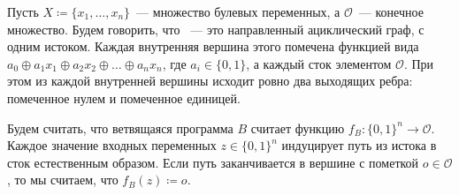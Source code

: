 \begin{definition*}
    Пусть $X \coloneqq \{x_1, \dots, x_n\}$~--- множество булевых переменных, а $\mathcal{O}$~---
    конечное множество. Будем говорить, что ~--- это направленный
    ациклический граф, с одним истоком. Каждая внутренняя вершина этого помечена функцией вида $a_0
    \oplus a_1 x_1 \oplus a_2 x_2 \oplus \dots \oplus a_n x_n$, где $a_{i} \in \{0, 1\}$, а каждый сток
    элементом $\mathcal{O}$. При этом из каждой внутренней вершины исходит ровно два выходящих ребра:
    помеченное нулем и помеченное единицей.

    Будем считать, что ветвящаяся программа $B$ считает функцию $f_{B}\colon \{0, 1\}^n \to
    \mathcal{O}$. Каждое значение входных переменных $z \in \{0, 1\}^n$ индуцирует путь из истока в сток
    естественным образом. Если путь заканчивается в вершине с пометкой $o \in \mathcal{O}$, то мы
    считаем, что $f_B(z) \coloneqq o$.
\end{definition*}

